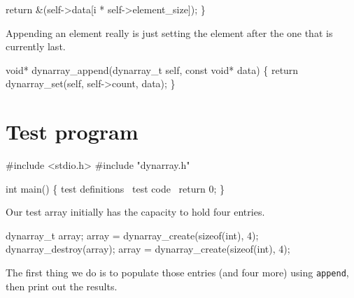     return &(self->data[i * self->element_size]);
\}

\nwendcode{}\nwdocspar

Appending an element really is just setting the element after
the one that is currently last.

\nwenddocs{}\plusendmoddef
void* dynarray_append(dynarray_t self, const void* data)
\{
    return dynarray_set(self, self->count, data);
\}

\nwendcode{}\nwdocspar


\section{Test program}

\nwenddocs{}\endmoddef
#include <stdio.h>
#include "dynarray.h"

int main()
\{
    \LA{}test definitions~{\nwtagstyle{}}\RA{}
    \LA{}test code~{\nwtagstyle{}}\RA{}
    return 0;
\}
\nwendcode{}\nwdocspar

Our test array initially has the capacity to hold four
entries.

\nwenddocs{}\endmoddef
dynarray_t array;
array = dynarray_create(sizeof(int), 4);
dynarray_destroy(array);
array = dynarray_create(sizeof(int), 4);
\nwendcode{}\nwdocspar

The first thing we do is to populate those entries (and four more)
using {\tt{}append}, then print out the results.

